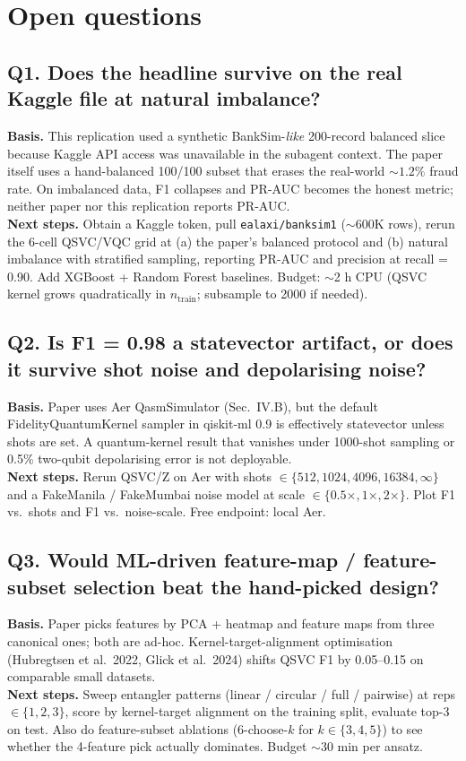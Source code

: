 \section{Open questions}

\subsection*{Q1. Does the headline survive on the real Kaggle file at natural imbalance?}
\textbf{Basis.} This replication used a synthetic BankSim-\emph{like} 200-record balanced
slice because Kaggle API access was unavailable in the subagent context. The paper
itself uses a hand-balanced 100/100 subset that erases the real-world $\sim 1.2\%$
fraud rate. On imbalanced data, F1 collapses and PR-AUC becomes the honest metric;
neither paper nor this replication reports PR-AUC.\\
\textbf{Next steps.} Obtain a Kaggle token, pull \texttt{ealaxi/banksim1}
($\sim$600K rows), rerun the 6-cell QSVC/VQC grid at (a) the paper's balanced protocol
and (b) natural imbalance with stratified sampling, reporting PR-AUC and precision at
recall = 0.90. Add XGBoost + Random Forest baselines. Budget: $\sim$2 h CPU (QSVC kernel
grows quadratically in $n_{\text{train}}$; subsample to 2000 if needed).

\subsection*{Q2. Is F1 = 0.98 a statevector artifact, or does it survive shot noise and depolarising noise?}
\textbf{Basis.} Paper uses Aer QasmSimulator (Sec.~IV.B), but the default FidelityQuantumKernel
sampler in qiskit-ml 0.9 is effectively statevector unless shots are set. A
quantum-kernel result that vanishes under 1000-shot sampling or 0.5\% two-qubit
depolarising error is not deployable.\\
\textbf{Next steps.} Rerun QSVC/Z on Aer with shots $\in \{512, 1024, 4096, 16384,
\infty\}$ and a FakeManila / FakeMumbai noise model at scale $\in \{0.5\times, 1\times,
2\times\}$. Plot F1 vs.\ shots and F1 vs.\ noise-scale. Free endpoint: local Aer.

\subsection*{Q3. Would ML-driven feature-map / feature-subset selection beat the hand-picked design?}
\textbf{Basis.} Paper picks features by PCA + heatmap and feature maps from three
canonical ones; both are ad-hoc. Kernel-target-alignment optimisation (Hubregtsen et
al.\ 2022, Glick et al.\ 2024) shifts QSVC F1 by 0.05--0.15 on comparable small
datasets.\\
\textbf{Next steps.} Sweep entangler patterns (linear / circular / full / pairwise) at
reps $\in \{1,2,3\}$, score by kernel-target alignment on the training split, evaluate
top-3 on test. Also do feature-subset ablations (6-choose-$k$ for $k \in \{3,4,5\}$)
to see whether the 4-feature pick actually dominates. Budget $\sim$30 min per ansatz.

